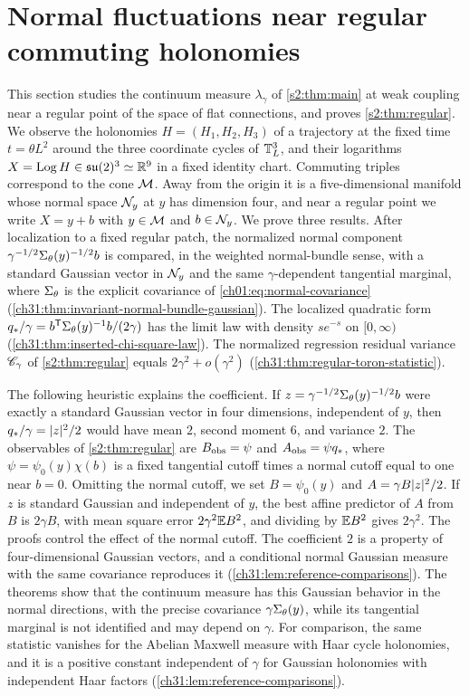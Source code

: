\chapter{Normal fluctuations near regular commuting holonomies}\label{ch31:chapter}

This section studies the continuum measure $\lambda_\gamma$ of \cref{s2:thm:main} at weak coupling near a regular point of the space of flat connections, and proves \cref{s2:thm:regular}. We observe the holonomies $H=(H_1,H_2,H_3)$ of a trajectory at the fixed time $t=\theta L^2$ around the three coordinate cycles of $\mathbb T_L^3$, and their logarithms $X=\operatorname{Log} H\in\mathfrak{su}(2)^3\simeq\mathbb R^9$ in a fixed identity chart. Commuting triples correspond to the cone $\mathcal M$. Away from the origin it is a five-dimensional manifold whose normal space $\mathcal N_{y}$ at $y$ has dimension four, and near a regular point we write $X=y+b$ with $y\in\mathcal M$ and $b\in\mathcal N_{y}$. We prove three results. After localization to a fixed regular patch, the normalized normal component $\gamma^{-1/2}\Sigma_\theta(y)^{-1/2}b$ is compared, in the weighted normal-bundle sense, with a standard Gaussian vector in $\mathcal N_{y}$ and the same $\gamma$-dependent tangential marginal, where $\Sigma_\theta$ is the explicit covariance of \eqref{ch01:eq:normal-covariance} (\cref{ch31:thm:invariant-normal-bundle-gaussian}). The localized quadratic form $q_*/\gamma=b^{\mathsf T}\Sigma_\theta(y)^{-1}b/(2\gamma)$ has the limit law with density $se^{-s}$ on $[0,\infty)$ (\cref{ch31:thm:inserted-chi-square-law}). The normalized regression residual variance $\mathscr C_\gamma$ of \cref{s2:thm:regular} equals $2\gamma^2+o(\gamma^2)$ (\cref{ch31:thm:regular-toron-statistic}).

The following heuristic explains the coefficient. If $z=\gamma^{-1/2}\Sigma_\theta(y)^{-1/2}b$ were exactly a standard Gaussian vector in four dimensions, independent of $y$, then $q_*/\gamma=\lvert z\rvert^2/2$ would have mean $2$, second moment $6$, and variance $2$. The observables of \cref{s2:thm:regular} are $B_{\mathrm{obs}}=\psi$ and $A_{\mathrm{obs}}=\psi q_*$, where $\psi=\psi_0(y)\chi(b)$ is a fixed tangential cutoff times a normal cutoff equal to one near $b=0$. Omitting the normal cutoff, we set $B=\psi_0(y)$ and $A=\gamma B\lvert z\rvert^2/2$. If $z$ is standard Gaussian and independent of $y$, the best affine predictor of $A$ from $B$ is $2\gamma B$, with mean square error $2\gamma^2\mathbb E B^2$, and dividing by $\mathbb E B^2$ gives $2\gamma^2$. The proofs control the effect of the normal cutoff. The coefficient $2$ is a property of four-dimensional Gaussian vectors, and a conditional normal Gaussian measure with the same covariance reproduces it (\cref{ch31:lem:reference-comparisons}). The theorems show that the continuum measure has this Gaussian behavior in the normal directions, with the precise covariance $\gamma\Sigma_\theta(y)$, while its tangential marginal is not identified and may depend on $\gamma$. For comparison, the same statistic vanishes for the Abelian Maxwell measure with Haar cycle holonomies, and it is a positive constant independent of $\gamma$ for Gaussian holonomies with independent Haar factors (\cref{ch31:lem:reference-comparisons}).

